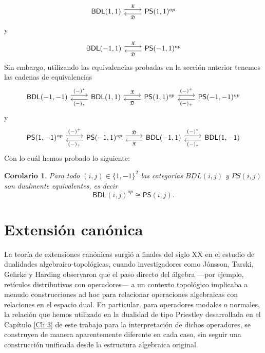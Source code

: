 \documentclass[12pt]{book}
\newtheorem{corollary}[theorem]{Corolario}
\newcommand{\BDL}{\mathsf{BDL}}
\newcommand{\PS}{\mathsf{PS}}
\newcommand{\D}{\mathfrak{D}}
\begin{document}
\[
\begin{tikzcd}
  \BDL(1,1)
    \arrow[r, shift left=0.7ex, "\mathfrak{X}"]
  & \PS(1,1)^{op}
    \arrow[l, shift left=0.7ex, "\D"]
\end{tikzcd}
\]
y 
\[
\begin{tikzcd}
  \BDL(-1,1)
    \arrow[r, shift left=0.7ex, "\mathfrak{X}"]
  & \PS(-1,1)^{op}
    \arrow[l, shift left=0.7ex, "\D"]
\end{tikzcd}
\]
Sin embargo, utilizando las equivalencias probadas en la sección anterior tenemos las cadenas de equivalencias
\[
\begin{tikzcd}
  \BDL(-1,-1)
    \arrow[r, shift left=0.7ex, "{(-)^*}"]
  & \BDL(1,1)
    \arrow[l, shift left=0.7ex, "{(-)_*}"]
    \arrow[r, shift left=0.7ex, "\mathfrak{X}"]
  & \PS(1,1)^{op}
    \arrow[l, shift left=0.7ex, "\D"]
    \arrow[r, shift left=0.7ex, "{(-)^{+}}"]
  & \PS(-1,-1)^{op}
    \arrow[l, shift left=0.7ex, "{(-)_{+}}"]
\end{tikzcd}
\]
y
\[
\begin{tikzcd}
  \PS(1,-1)^{op}
    \arrow[r, shift left=0.7ex, "{(-)^{+}}"]
  & \PS(-1,1)^{op}
    \arrow[l, shift left=0.7ex, "{(-)_{+}}"]
    \arrow[r, shift left=0.7ex, "\D"]
  & \BDL(-1,1)
    \arrow[l, shift left=0.7ex, "\mathfrak{X}"]
    \arrow[r, shift left=0.7ex, "{(-)^*}"]
  & \BDL(1,-1)
    \arrow[l, shift left=0.7ex, "{(-)_*}"]
\end{tikzcd}
\]
Con lo cuál hemos probado lo siguiente:
\begin{corollary}
Para todo $(i,j)\in \{1,-1\}^{2}$ las categorías $BDL(i,j)$ y
$PS(i,j)$ son dualmente equivalentes, es decir
\[ \BDL(i,j)^{op} \cong \PS(i,j). \]
\end{corollary}













\chapter{Extensión canónica} \label{Ch 4}


La teoría de extensiones canónicas surgió a finales del siglo XX en el estudio de dualidades algebraico‑topológicas, cuando investigadores como Jónsson, Tarski, Gehrke y Harding observaron que el paso directo del álgebra —por ejemplo, retículos distributivos con operadores— a un contexto topológico implicaba a menudo construcciones ad hoc para relacionar operaciones algebraicas con relaciones en el espacio dual. En particular, para operadores modales o normales, la relación que hemos utilizado en la dualidad de tipo Priestley desarrollada en el Capítulo \ref{Ch 3} de este trabajo para la interpretación de dichos operadores, se construyen de manera aparentemente diferente en cada caso, sin seguir una construcción unificada desde la estructura algebraica original.
\medskip
\end{document}
